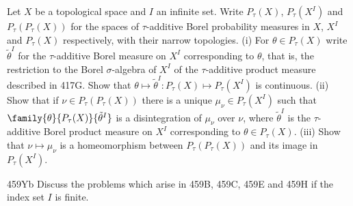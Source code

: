 {%
 Let $X$ be a
topological space and $I$ an infinite set.   Write $P_{\tau}(X)$,
$P_{\tau}(X^I)$ and
$P_{\tau}(P_{\tau}(X))$ for the spaces of $\tau$-additive Borel probability
measures in $X$, $X^I$ and $P_{\tau}(X)$ respectively,
with their narrow topologies.
(i) For $\theta\in P_{\tau}(X)$ write
$\tilde\theta^I$ for the $\tau$-additive Borel measure on $X^I$
corresponding to $\theta$, that is, the restriction to the Borel
$\sigma$-algebra of $X^I$ of the $\tau$-additive product measure described
in 417G.   Show that
$\theta\mapsto\tilde\theta^I:P_{\tau}(X)\mapsto P_{\tau}(X^I)$ is
continuous.   (ii) Show that
if $\nu\in P_{\tau}(P_{\tau}(X))$ there is a unique
$\mu_{\nu}\in P_{\tau}(X^I)$ such that
$\family{\theta}{P_{\tau}{(X)}}{\tilde\theta^I}$ is a disintegration of
$\mu_{\nu}$ over $\nu$, where $\tilde\theta^I$ is the $\tau$-additive
Borel product
measure on $X^I$ corresponding to $\theta\in P_{\tau}(X)$.
(iii) Show that $\nu\mapsto\mu_{\nu}$ is a homeomorphism between
$P_{\tau}(P_{\tau}(X))$ and its image in $P_{\tau}(X^I)$.

\spheader 459Yb
Discuss the problems which arise in
459B, 459C, 459E and 459H if the index set $I$ is finite.
}%


